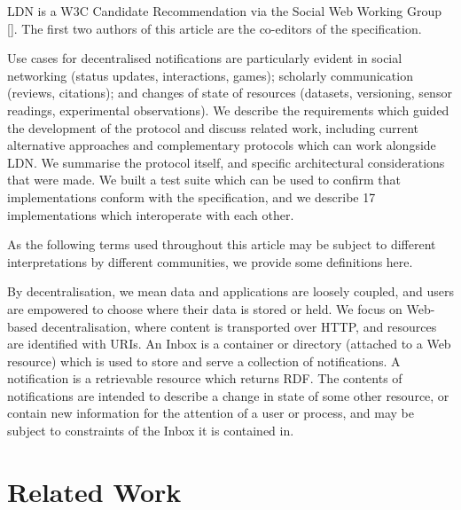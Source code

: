 \documentclass[a4paper]{llncs}
\begin{document}
                            
\par LDN is a W3C \empty Candidate Recommendation via the \empty Social Web Working Group []. The first two authors of this article are the co-editors of the specification.

                            
\par Use cases for decentralised notifications are particularly evident in social networking (status updates, interactions, games); scholarly communication (reviews, citations); and changes of state of resources (datasets, versioning, sensor readings, experimental observations). We describe the requirements which guided the development of the protocol and discuss related work, including current alternative approaches and complementary protocols which can work alongside LDN. We summarise the protocol itself, and specific architectural considerations that were made. We built a test suite which can be used to confirm that implementations conform with the specification, and we describe 17 implementations which interoperate with each other.

                            
                                
\par As the following terms used throughout this article may be subject to different interpretations by different communities, we provide some definitions here.

                                
\par By decentralisation, we mean data and applications are loosely coupled, and users are empowered to choose where their data is stored or held. We focus on Web-based decentralisation, where content is transported over HTTP, and resources are identified with URIs. An Inbox is a container or directory (attached to a Web resource) which is used to store and serve a collection of notifications. A notification is a retrievable resource which returns RDF. The contents of notifications are intended to describe a change in state of some other resource, or contain new information for the attention of a user or process, and may be subject to constraints of the Inbox it is contained in.
                                
                            

                            
                        
                    

                    
                        \section{Related Work}
  \label{related-work}
\end{document}
